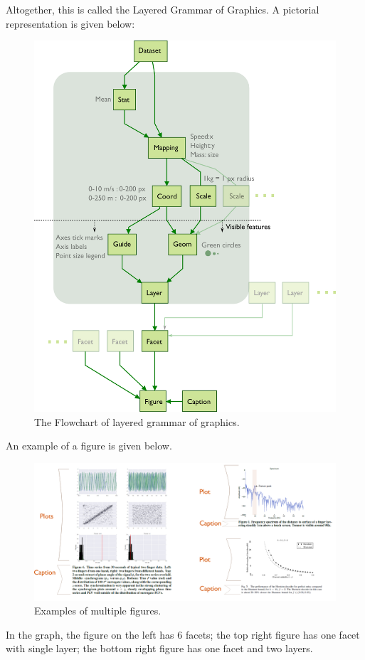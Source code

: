 \documentclass[a4paper, openany]{memoir}
\begin{document}
\noindent Altogether, this is called the Layered Grammar of Graphics. A pictorial representation is given below:
\begin{figure}[H]
    \centering
    \includegraphics[scale=0.5]{src/2.1 grammar of graphics.png}
    \caption{The Flowchart of layered grammar of graphics.}
\end{figure}

An example of a figure is given below.
\begin{figure}[H]
    \centering
    \includegraphics[scale=0.25]{src/2.2 figure examples.png}
    \caption{Examples of multiple figures.}
\end{figure}
\noindent In the graph, the figure on the left has 6 facets; the top right figure has one facet with single layer; the bottom right figure has one facet and two layers.
\end{document}
